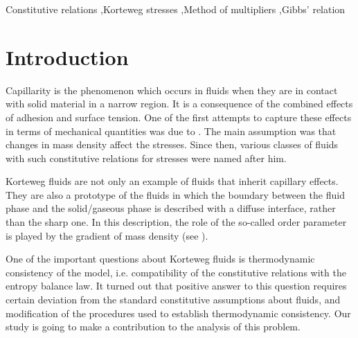 \documentclass[a4paper,fleqn]{cas-sc}
\theoremstyle{definition}
\begin{document}



\begin{keywords}
Constitutive relations \sep Korteweg stresses \sep Method of multipliers \sep Gibbs' relation
\end{keywords}

\maketitle



\section{Introduction} 

Capillarity is the phenomenon which occurs in fluids when they are in contact with solid material in a narrow region. It is a consequence of the combined effects of adhesion and surface tension. One of the first attempts to capture these effects in terms of mechanical quantities was due to \cite{korteweg1901forme}. The main assumption was that changes in mass density affect the stresses. Since then, various classes of fluids with such constitutive relations for stresses were named after him. 

Korteweg fluids are not only an example of fluids that inherit capillary effects. They are also a prototype of the fluids in which the boundary between the fluid phase and the solid/gaseous phase is described with a diffuse interface, rather than the sharp one. In this description, the role of the so-called order parameter is played by the gradient of mass density (see \cite{anderson1998diffuse}). 

One of the important questions about Korteweg fluids is thermodynamic consistency of the model, i.e. compatibility of the constitutive relations with the entropy balance law. It turned out that positive answer to this question requires certain deviation from the standard constitutive assumptions about fluids, and modification of the procedures used to establish thermodynamic consistency. Our study is going to make a contribution to the analysis of this problem. 
\end{document}
